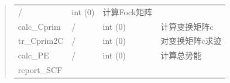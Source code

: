 \documentclass[11pt]{article}
\begin{document}
\begin{quote}
\begin{longtable}[]{@{}llll@{}}
\begin{minipage}[t]{0.14\columnwidth}
/\strut
\end{minipage} & \begin{minipage}[t]{0.09\columnwidth}\raggedright\strut
int (0)\strut
\end{minipage} & \begin{minipage}[t]{0.51\columnwidth}\raggedright\strut
计算Fock矩阵\strut
\end{minipage}\tabularnewline
\begin{minipage}[t]{0.15\columnwidth}\raggedright\strut
calc\_Cprim\strut
\end{minipage} & \begin{minipage}[t]{0.14\columnwidth}\raggedright\strut
/\strut
\end{minipage} & \begin{minipage}[t]{0.09\columnwidth}\raggedright\strut
int (0)\strut
\end{minipage} & \begin{minipage}[t]{0.51\columnwidth}\raggedright\strut
计算变换矩阵c\strut
\end{minipage}\tabularnewline
\begin{minipage}[t]{0.15\columnwidth}\raggedright\strut
tr\_Cprim2C\strut
\end{minipage} & \begin{minipage}[t]{0.14\columnwidth}\raggedright\strut
/\strut
\end{minipage} & \begin{minipage}[t]{0.09\columnwidth}\raggedright\strut
int (0)\strut
\end{minipage} & \begin{minipage}[t]{0.51\columnwidth}\raggedright\strut
对变换矩阵c求迹\strut
\end{minipage}\tabularnewline
\begin{minipage}[t]{0.15\columnwidth}\raggedright\strut
calc\_PE\strut
\end{minipage} & \begin{minipage}[t]{0.14\columnwidth}\raggedright\strut
/\strut
\end{minipage} & \begin{minipage}[t]{0.09\columnwidth}\raggedright\strut
int (0)\strut
\end{minipage} & \begin{minipage}[t]{0.51\columnwidth}\raggedright\strut
计算总势能\strut
\end{minipage}\tabularnewline
\begin{minipage}[t]{0.15\columnwidth}\raggedright\strut
report\_SCF\strut
\end{minipage} & \begin{minipage}[t]{0.14\columnwidth}\raggedright\strut

\end{minipage}
\end{longtable}
\end{quote}
\end{document}

